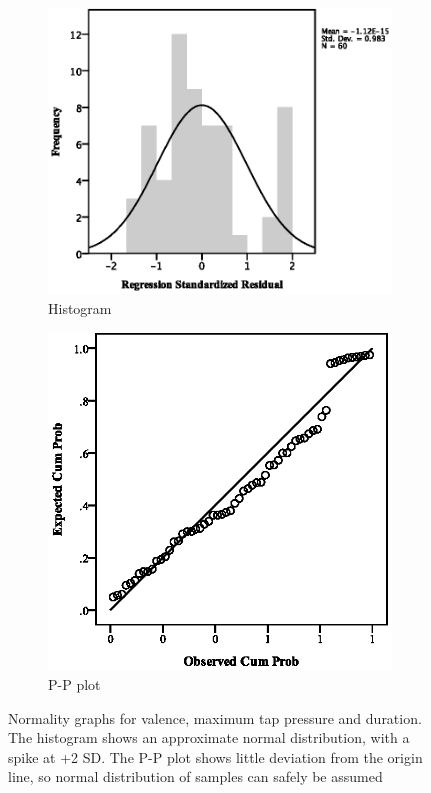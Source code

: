 \begin{figure}[ht]
\centering
\begin{subfigure}[b]{0.45\textwidth}
    \centering
    \includegraphics[width=\textwidth]{images/normality/ValMax/HistValMax.eps}
    \caption{Histogram}
    \label{fig:histvalmax}
\end{subfigure}
\quad
\begin{subfigure}[b]{0.45\textwidth}
    \centering
    \includegraphics[width=\textwidth]{images/normality/ValMax/PPValMax.eps}
    \caption{P-P plot}
    \label{fig:ppvalmax}
\end{subfigure}
\caption{Normality graphs for valence, maximum tap pressure and duration. The histogram shows an approximate normal distribution, with a spike at +2 SD. The P-P plot shows little deviation from the origin line, so normal distribution of samples can safely be assumed}
\end{figure}
